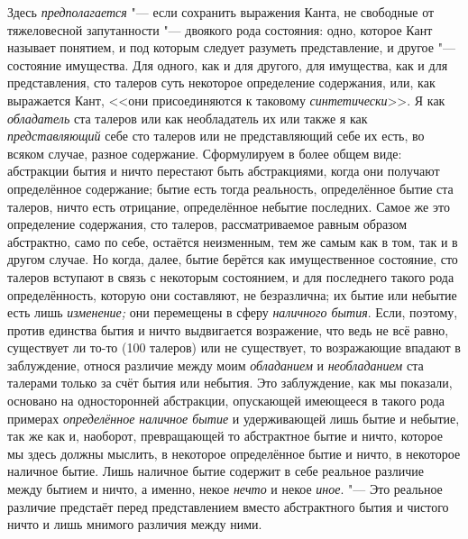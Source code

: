 Здесь {\em предполагается} "--- если сохранить выражения Канта, не свободные от
тяжеловесной запутанности "--- двоякого рода состояния: одно, которое Кант
называет понятием, и под которым следует разуметь представление, и другое "---
состояние имущества. Для одного, как и для другого, для имущества, как и для
представления, сто талеров суть некоторое определение содержания, или, как
выражается Кант, <<они присоединяются к таковому {\em синтетически}>>. Я как
{\em обладатель} ста талеров или как необладатель их или также я как {\em
представляющий} себе сто талеров или не представляющий себе их есть, во всяком
случае, разное содержание. Сформулируем в более общем виде: абстракции бытия и
ничто перестают быть абстракциями, когда они получают определённое содержание;
бытие есть тогда реальность, определённое бытие ста талеров, ничто есть
отрицание, определённое небытие последних. Самое же это определение содержания,
сто талеров, рассматриваемое равным образом абстрактно, само по себе, остаётся
неизменным, тем же самым как в том, так и в другом случае. Но когда, далее,
бытие берётся как имущественное состояние, сто талеров вступают в связь с
некоторым состоянием, и для последнего такого рода определённость, которую они
составляют, не безразлична; их бытие или небытие есть лишь {\em изменение;} они
перемещены в сферу {\em наличного бытия}. Если, поэтому, против единства бытия
и ничто выдвигается возражение, что ведь не всё равно, существует ли то-то (100
талеров) или не существует, то возражающие впадают в заблуждение, относя
различие между моим {\em обладанием} и {\em необладанием} ста талерами только
за счёт бытия или небытия. Это заблуждение, как мы показали, основано на
односторонней абстракции, опускающей имеющееся в такого рода примерах {\em
определённое наличное бытие} и удерживающей лишь бытие и небытие, так же как и,
наоборот, превращающей то абстрактное бытие и ничто, которое мы здесь должны
мыслить, в некоторое определённое бытие и ничто, в некоторое наличное бытие.
Лишь наличное бытие содержит в себе реальное различие между бытием и ничто, а
именно, некое {\em нечто} и некое {\em иное}. "--- Это реальное различие
предстаёт перед представлением вместо абстрактного бытия и чистого ничто и лишь
мнимого различия между ними.


